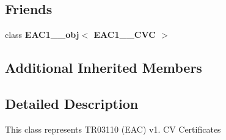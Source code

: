 \subsection*{Friends}
\begin{DoxyCompactItemize}
\item 
\hypertarget{classBotan_1_1EAC1__1__CVC_af9549d4cc622818265d81ff6e0e0cfbf}{class {\bfseries E\-A\-C1\-\_\-\_\-obj$<$ E\-A\-C1\-\_\-\_\-\-C\-V\-C $>$}}\label{classBotan_1_1EAC1__1__CVC_af9549d4cc622818265d81ff6e0e0cfbf}

\end{DoxyCompactItemize}
\subsection*{Additional Inherited Members}


\subsection{Detailed Description}
This class represents T\-R03110 (E\-A\-C) v1. C\-V Certificates 

